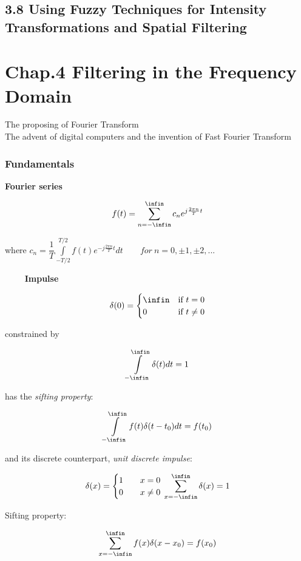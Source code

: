 \documentclass[]{article}
\begin{document}
\subsection{3.8 Using Fuzzy Techniques for Intensity Transformations and
Spatial Filtering}\label{header-n358}

\section{Chap.4 Filtering in the Frequency Domain}\label{header-n361}

The proposing of Fourier Transform \\
 The advent of digital computers and the invention of Fast Fourier
Transform

\subsubsection{Fundamentals}\label{header-n365}

\textbf{Fourier series}

\[f(t)=\sum\limits^{\infin}_{n=-\infin}c_ne^{j\frac{2\pi n}{T}t}\]

where
\(c_n=\dfrac{1}{T}\int\limits^{T/2}_{-T/2}f(t)e^{-j\frac{2\pi n}{T}t}dt\qquad for\ n=0,\pm1,\pm2,...\)

\(\quad\quad\) \textbf{Impulse}

\[\delta(0)=
\begin{cases}
\infin & \text{if   $t=0$}\\
0 & \text{if $t\neq0$}
\end{cases}\]

constrained by

\[\int\limits^{\infin}_{-\infin}\delta{(t)dt}=1\]

has the \emph{sifting property}:

\[\int\limits^{\infin}_{-\infin}f(t)\delta(t-t_0)dt=f(t_0)\]

and its discrete counterpart, \emph{unit discrete impulse}:

\[\delta(x)=\begin{cases}
1 & \quad x=0\\
0 & \quad x\neq 0
\end{cases}\\
\sum\limits^{\infin}_{x=-\infin}\delta(x)=1\]

Sifting property:

\[\sum\limits^{\infin}_{x=-\infin}f(x)\delta(x-x_0)=f(x_0)\\\]
\end{document}
